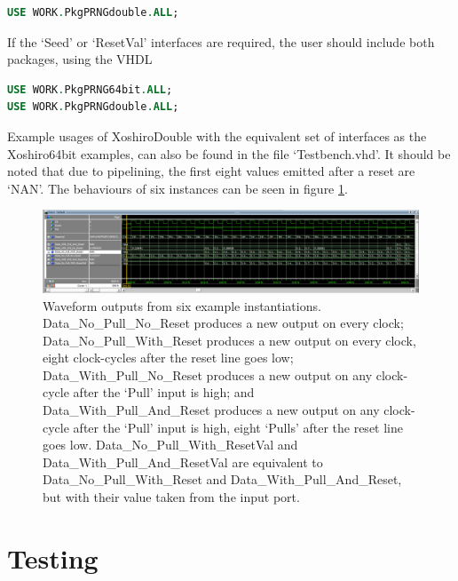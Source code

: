 \documentclass{article}
\begin{document}
\begin{minipage}{1.0\textwidth}
\centering
\begin{lstlisting}[language=VHDL, label=lst:PkgPRNGdouble]
USE WORK.PkgPRNGdouble.ALL;
\end{lstlisting}
\end{minipage}

If the `Seed' or `ResetVal' interfaces are required, the user should include both packages, using the VHDL

\begin{minipage}{1.0\textwidth}
\centering
\begin{lstlisting}[language=VHDL, label=lst:PkgPRNGall]
USE WORK.PkgPRNG64bit.ALL;
USE WORK.PkgPRNGdouble.ALL;
\end{lstlisting}
\end{minipage}

Example usages of XoshiroDouble with the equivalent set of interfaces as the Xoshiro64bit examples, can also be found in the file `Testbench.vhd'. It should be noted that due to pipelining, the first eight values emitted after a reset are `NAN'. The behaviours of six instances can be seen in figure \ref{fig:Modelsim_GUI_double_output}.

\begin{figure}[ht]
\centering
\includegraphics[width=\textwidth]{ModelsimGuiDouble.png}
\caption{Waveform outputs from six example instantiations. Data\_No\_Pull\_No\_Reset produces a new output on every clock; Data\_No\_Pull\_With\_Reset produces a new output on every clock, eight clock-cycles after the reset line goes low; Data\_With\_Pull\_No\_Reset produces a new output on any clock-cycle after the `Pull' input is high; and Data\_With\_Pull\_And\_Reset produces a new output on any clock-cycle after the `Pull' input is high, eight `Pulls' after the reset line goes low. Data\_No\_Pull\_With\_ResetVal and Data\_With\_Pull\_And\_ResetVal are equivalent to Data\_No\_Pull\_With\_Reset and Data\_With\_Pull\_And\_Reset, but with their value taken from the input port.}
\label{fig:Modelsim_GUI_double_output}
\end{figure}


\section{Testing}
\end{document}
